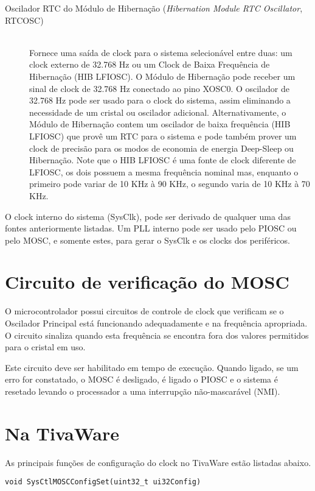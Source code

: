 \begin{description}
	\item [Oscilador RTC do Módulo de Hibernação (\emph{Hibernation Module RTC Oscillator}, RTCOSC)]\hfill \\
	Fornece uma saída de clock para o sistema selecionável entre duas: um clock externo de 32.768 Hz ou um Clock de Baixa Frequência de Hibernação (HIB LFIOSC). O Módulo de Hibernação pode receber um sinal de clock de 32.768 Hz conectado ao pino XOSC0. O oscilador de 32.768 Hz pode ser usado para o clock do sistema, assim eliminando a necessidade de um cristal ou oscilador adicional. Alternativamente, o Módulo de Hibernação contem um oscilador de baixa frequência (HIB LFIOSC) que provê um RTC para o sistema e pode também prover um clock de precisão para os modos de economia de energia Deep-Sleep ou Hibernação. Note que o HIB LFIOSC é uma fonte de clock diferente de LFIOSC, os dois possuem a mesma frequência nominal mas, enquanto o primeiro pode variar de 10 KHz à 90 KHz, o segundo varia de 10 KHz à 70 KHz.
\end{description}

O clock interno do sistema (SysClk), pode ser derivado de qualquer uma das fontes anteriormente listadas. Um PLL interno pode ser usado pelo PIOSC ou pelo MOSC, e somente estes, para gerar o SysClk e os clocks dos periféricos.

\section{Circuito de verificação do MOSC}

O microcontrolador possui circuitos de controle de clock que verificam se o Oscilador Principal está funcionando adequadamente e na frequência apropriada. O circuito sinaliza quando esta frequência se encontra fora dos valores permitidos para o cristal em uso.

Este circuito deve ser habilitado em tempo de execução. Quando ligado, se um erro for constatado, o MOSC é desligado, é ligado o PIOSC e o sistema é resetado levando o processador a uma interrupção não-mascarável (NMI).


\section{Na TivaWare}

As principais funções de configuração do clock no TivaWare estão listadas abaixo.

\begin{lstlisting}[style=funcao]
	void SysCtlMOSCConfigSet(uint32_t ui32Config)
\end{lstlisting}

